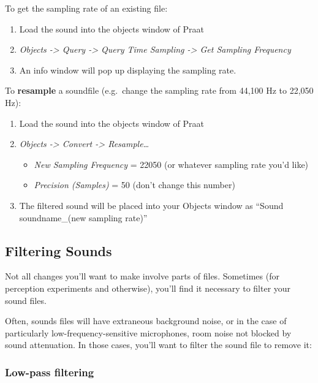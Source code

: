 To get the sampling rate of an existing file:

\begin{enumerate}
\def\labelenumi{\arabic{enumi}.}
\tightlist
\item
  Load the sound into the objects window of Praat
\item
  \emph{Objects -\textgreater{} Query -\textgreater{} Query Time
  Sampling -\textgreater{} Get Sampling Frequency}
\item
  An info window will pop up displaying the sampling rate.
\end{enumerate}

To \textbf{resample} a soundfile (e.g.~change the sampling rate from
44,100 Hz to 22,050 Hz):

\begin{enumerate}
\def\labelenumi{\arabic{enumi}.}
\tightlist
\item
  Load the sound into the objects window of Praat
\item
  \emph{Objects -\textgreater{} Convert -\textgreater{}
  Resample\ldots{}}

  \begin{itemize}
  \tightlist
  \item
    \emph{New Sampling Frequency} = 22050 (or whatever sampling rate
    you'd like)
  \item
    \emph{Precision (Samples)} = 50 (don't change this number)
  \end{itemize}
\item
  The filtered sound will be placed into your Objects window as ``Sound
  soundname\_(new sampling rate)''
\end{enumerate}

\hypertarget{filtering-sounds}{%
\subsection{Filtering Sounds}\label{filtering-sounds}}

Not all changes you'll want to make involve parts of files. Sometimes
(for perception experiments and otherwise), you'll find it necessary to
filter your sound files.

Often, sounds files will have extraneous background noise, or in the
case of particularly low-frequency-sensitive microphones, room noise not
blocked by sound attenuation. In those cases, you'll want to filter the
sound file to remove it:

\hypertarget{low-pass-filtering}{%
\subsubsection{Low-pass filtering}\label{low-pass-filtering}}

